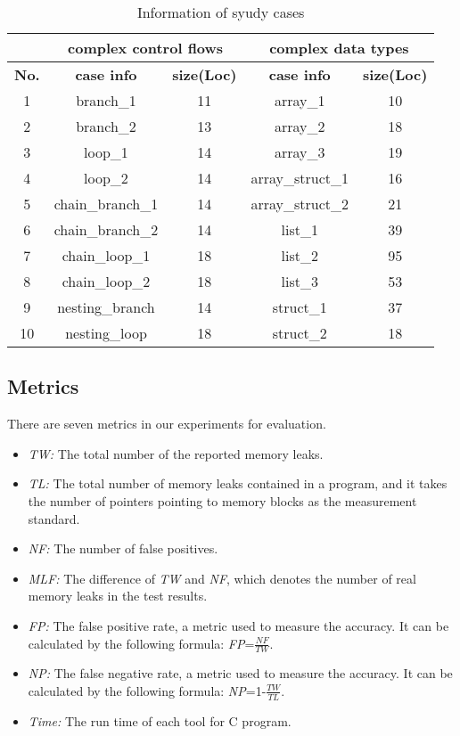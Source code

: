 \begin{table}[!h]
\center
\caption{Information of syudy cases}\label{tab:2}
\begin{tabular}{|c|c|c|c|c|}
\hline
&\multicolumn{2}{|c|}{\textbf{complex control flows}} & \multicolumn{2}{|c|}{\textbf{complex data types}}\\
\hline
\textbf{No.} & \textbf{case info} & \textbf{size(Loc)} & \textbf{case info} & \textbf{size(Loc)}\\
\hline
1 & branch\_1 & 11 & array\_1 & 10\\
\hline
2 & branch\_2 & 13 & array\_2 &	18\\
\hline
3 & loop\_1 & 14 & array\_3 & 19\\
\hline
4 & loop\_2 & 14 &	array\_struct\_1 &	16\\
\hline
5 & chain\_branch\_1 & 14 &	array\_struct\_2 &	21\\
\hline
6 & chain\_branch\_2 & 14 &	list\_1 &	39\\
\hline
7 & chain\_loop\_1 & 18 &	list\_2 &	95\\
\hline
8 & chain\_loop\_2 & 18 &	list\_3 &	53\\
\hline
9 & nesting\_branch & 14 &	struct\_1 &	37\\
\hline
10 & nesting\_loop & 18 &	struct\_2 &	18\\
\hline
\end{tabular}
\end{table}
%
\subsection{Metrics}\label{ssec:m}
There are seven metrics in our experiments for evaluation.
\begin{itemize}
\item \textit{TW:} The total number of the reported memory leaks.
\item \textit{TL:} The total number of memory leaks contained in a program, and it takes the number of pointers pointing to memory blocks as the measurement standard.
\item \textit{NF:} The number of false positives.
\item \textit{MLF:} The difference of \textit{TW} and \textit{NF}, which denotes the number of real memory leaks in the test results.
\item \textit{FP:} The false positive rate, a metric used to measure the accuracy. It can be calculated by the following formula: \textit{FP}=$\frac{\textit{NF}}{\textit{TW}}$.
\item \textit{NP:} The false negative rate, a metric used to measure the accuracy. It can be calculated by the following formula: \textit{NP}=1-$\frac{\textit{TW}}{\textit{TL}}$.
\item \textit{Time:} The run time of each tool for C program.
\end{itemize}